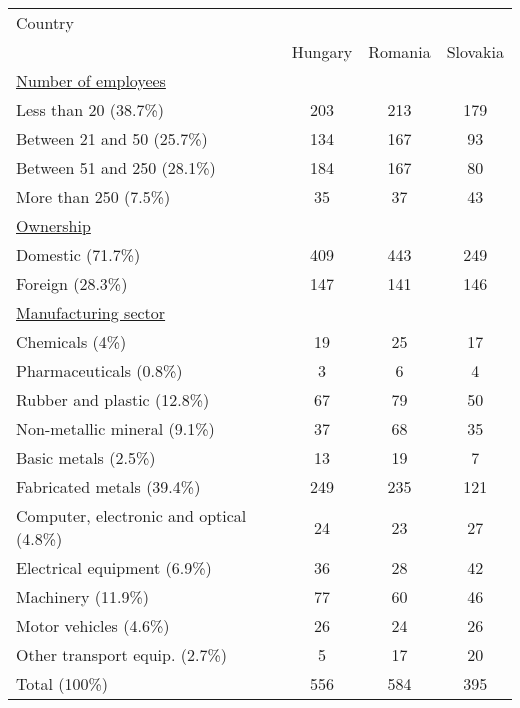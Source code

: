 
\begin{tabular}{lccc} 
\toprule
	Country		\\
	&Hungary	&Romania & Slovakia  \\
	\midrule
\ul{Number of employees}	&&& \\			
Less than 20 (38.7\%)	 &	203	&213&	179	 \\
Between 21 and 50  (25.7\%)	&	134&	167&	93	\\
Between 51 and 250 (28.1\%)		&184	&167	&80	  \\
More than 250	 (7.5\%)	&35&	37&	43	 \\
\addlinespace[2ex]
\ul{Ownership} &&& \\				
Domestic (71.7\%)	& 409	&443	&249	 \\
Foreign	 (28.3\%)	&147	&141	&146	 \\
\addlinespace[2ex]
\ul{Manufacturing sector} &&&\\				
Chemicals  (4\%)	& 	19 &	25 &	17	 \\
Pharmaceuticals (0.8\%)	&	3	&6	&4	 \\
Rubber and plastic  (12.8\%)	&	67&	79&	50\\
Non-metallic mineral  (9.1\%)	&	37&	68&	35 \\
Basic metals  (2.5\%)		&13	&19	&7	\\
Fabricated metals  (39.4\%)	&	249	&235	&121\\
Computer, electronic and optical (4.8\%)	 &	24	&23&	27 \\
Electrical equipment (6.9\%)		&36	&28	&42	\\
Machinery (11.9\%)	 &77	&60&	46 \\
Motor vehicles (4.6\%)	&	26&	24&	26 \\
Other transport equip. (2.7\%)	 &	5	&17	&20 \\
\midrule

Total	 (100\%)	&556	&584	&395	\\
\bottomrule
\end{tabular}
